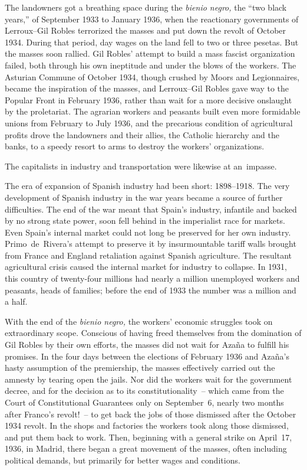 The landowners got a breathing space during the \emph{bienio negro,}{\indexbienionegro} the ``two black years,'' of September 1933 to January 1936, when the reactionary governments of Lerroux--Gil Robles{\indexALerroux\indexGRobles} terrorized the masses and put down the revolt of October 1934. During that period, day wages on the land fell to two or three pesetas. But the masses soon rallied. Gil Robles’ attempt to build a mass fascist organization failed, both through his own ineptitude and under the blows of the workers. The Asturian Commune of October 1934, though crushed by Moors and Legionnaires, became the inspiration of the masses, and Lerroux--Gil Robles gave way to the Popular Front in February 1936, rather than wait for a more decisive onslaught by the proletariat. The agrarian workers and peasants built even more formidable unions from February to July 1936, and the precarious condition of agricultural profits drove the landowners and their allies, the Catholic hierarchy and the banks, to a speedy resort to arms to destroy the workers’ organizations.

The capitalists in industry and transportation were likewise at an~impasse.

The era of expansion of Spanish industry had been short: 1898--1918. The very development of Spanish industry in the war years became a source of further difficulties. The end of the war meant that Spain’s industry, infantile and backed by no strong state power, soon fell behind in the imperialist race for markets. Even Spain’s internal market could not long be preserved for her own industry. Primo~de~Rivera’s attempt to preserve it by insurmountable tariff walls brought from France and England retaliation against Spanish agriculture. The resultant agricultural crisis caused the internal market for industry to collapse. In 1931, this country of twenty-four millions had nearly a million unemployed workers and peasants, heads of families; before the end of 1933 the number was a million and a half.

With the end of the \emph{bienio negro,} the workers’ economic struggles took on extraordinary scope. Conscious of having freed themselves from the domination of Gil Robles by their own efforts, the masses did not wait for Azaña to fulfill his promises. In the four days between the elections of February 1936 and Azaña’s hasty assumption of the premiership, the masses effectively carried out the amnesty by tearing open the jails. Nor did the workers wait for the government decree, and for the decision as to its constitutionality~-- which came from the Court of Constitutional Guarantees only on September~6, nearly two months after Franco’s revolt!~-- to get back the jobs of those dismissed after the October 1934 revolt. In the shops and factories the workers took along those dismissed, and put them back to work. Then, beginning with a general strike on April~17, 1936, in Madrid, there began a great movement of the masses, often including political demands, but primarily for better wages and conditions.

